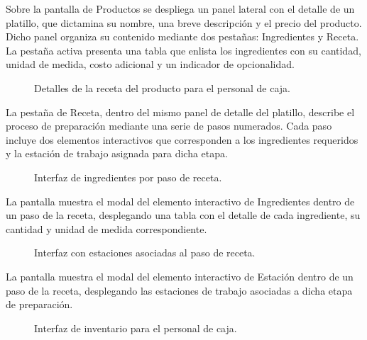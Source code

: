 Sobre la pantalla de Productos se despliega un panel lateral con el detalle de un platillo, que dictamina su nombre, una breve descripción y el precio del producto. Dicho panel organiza su contenido mediante dos pestañas: Ingredientes y Receta. La pestaña activa presenta una tabla que enlista los ingredientes con su cantidad, unidad de medida, costo adicional y un indicador de opcionalidad.

\begin{figure}[H]
    \centering
    
    \caption{Detalles de la receta del producto para el personal de caja.}
    \label{fig:ui-caj-05}
\end{figure}

La pestaña de Receta, dentro del mismo panel de detalle del platillo, describe el proceso de preparación mediante una serie de pasos numerados. Cada paso incluye dos elementos interactivos que corresponden a los ingredientes requeridos y la estación de trabajo asignada para dicha etapa. 

\begin{figure}[H]
    \centering
    
    \caption{Interfaz de ingredientes por paso de receta.}
    \label{fig:ui-caj-05-a}
\end{figure}

La pantalla muestra el modal del elemento interactivo de Ingredientes dentro de un paso de la receta, desplegando una tabla con el detalle de cada ingrediente, su cantidad y unidad de medida correspondiente.

\begin{figure}[H]
    \centering
    
    \caption{Interfaz con estaciones asociadas al paso de receta.}
    \label{fig:ui-caj-05-b}
\end{figure}

La pantalla muestra el modal del elemento interactivo de Estación dentro de un paso de la receta, desplegando las estaciones de trabajo asociadas a dicha etapa de preparación.

\begin{figure}[H]
    \centering
    
    \caption{Interfaz de inventario para el personal de caja.}
    \label{fig:ui-caj-06}
\end{figure}

